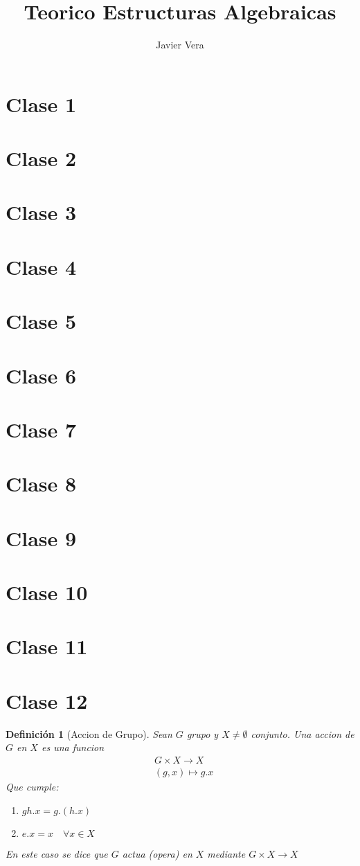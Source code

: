 \documentclass[10pt]{extarticle}
\theoremstyle{break}
\newtheorem{definition}{Definición}[section]
\theoremstyle{definition}
\begin{document}
\title{Teorico Estructuras Algebraicas}
\author{Javier Vera}
\maketitle


\section{Clase 1}
\section{Clase 2}
\section{Clase 3}
\section{Clase 4}
\section{Clase 5}
\section{Clase 6}
\section{Clase 7}
\section{Clase 8}
\section{Clase 9}
\section{Clase 10}
\section{Clase 11}

\section{Clase 12}

\begin{definition}[Accion de Grupo]
	Sean $G$ grupo y $X\neq\emptyset$ conjunto. Una accion de $G$ en $X$ es una funcion
	\begin{align} 
	& G\times X\longrightarrow X \nonumber\\
	& (g,x)\longmapsto g.x \nonumber
	\end{align}
	Que cumple:

	\begin{enumerate}
		\item $gh.x=g.(h.x)$
		\item $e.x=x\quad\forall x\in X$
	\end{enumerate}
En este caso se dice que $G$ actua (opera) en $X$ mediante $G\times X\longrightarrow X$
\end{definition}
\end{document}
